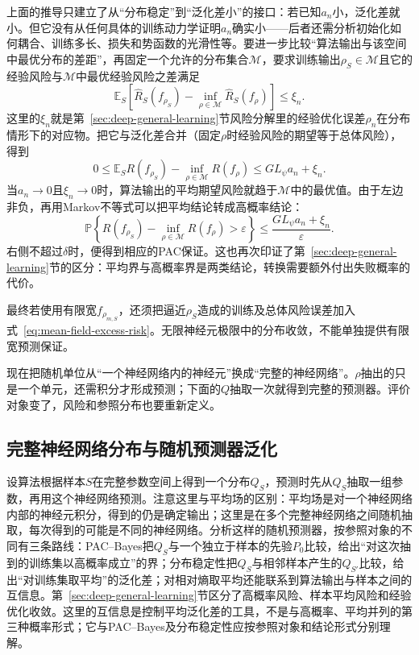上面的推导只建立了从“分布稳定”到“泛化差小”的接口：若已知$a_n$小，泛化差就小。但它没有从任何具体的训练动力学证明$a_n$确实小——后者还需分析初始化如何耦合、训练多长、损失和势函数的光滑性等。要进一步比较“算法输出与该空间中最优分布的差距”，再固定一个允许的分布集合$\mathcal M$，要求训练输出$\rho_S\in\mathcal M$且它的经验风险与$\mathcal M$中最优经验风险之差满足
\[
 \mathbb E_S\left[
   \hat R_S(f_{\rho_S})
   -\inf_{\rho\in\mathcal M}\hat R_S(f_\rho)
 \right]\leq\xi_n.
\]
这里的$\xi_n$就是第~\ref{sec:deep-general-learning}节风险分解里的经验优化误差$\rho_n$在分布情形下的对应物。把它与泛化差合并（固定$\rho$时经验风险的期望等于总体风险），得到
\begin{equation}
 0\leq
 \mathbb E_S R(f_{\rho_S})
 -\inf_{\rho\in\mathcal M}R(f_\rho)
 \leq G L_\psi a_n+\xi_n.
 \label{eq:mean-field-excess-risk}
\end{equation}
当$a_n\to0$且$\xi_n\to0$时，算法输出的平均期望风险就趋于$\mathcal M$中的最优值。由于左边非负，再用Markov不等式可以把平均结论转成高概率结论：
\[
 \mathbb P\left\{
 R(f_{\rho_S})-\inf_{\rho\in\mathcal M}R(f_\rho)>\varepsilon
 \right\}
 \leq\frac{G L_\psi a_n+\xi_n}{\varepsilon}.
\]
右侧不超过$\delta$时，便得到相应的PAC保证。这也再次印证了第~\ref{sec:deep-general-learning}节的区分：平均界与高概率界是两类结论，转换需要额外付出失败概率的代价。

最终若使用有限宽$f_{\rho_{m,S}}$，还须把逼近$\rho_S$造成的训练及总体风险误差加入式~\eqref{eq:mean-field-excess-risk}。无限神经元极限中的分布收敛，不能单独提供有限宽预测保证。

现在把随机单位从“一个神经网络内的神经元”换成“完整的神经网络”。$\rho$抽出的只是一个单元，还需积分才形成预测；下面的$Q$抽取一次就得到完整的预测器。评价对象变了，风险和参照分布也要重新定义。

\subsection{完整神经网络分布与随机预测器泛化}
\label{sec:pac-bayes}

设算法根据样本$S$在完整参数空间上得到一个分布$Q_S$，预测时先从$Q_S$抽取一组参数，再用这个神经网络预测。注意这里与平均场的区别：平均场是对一个神经网络内部的神经元积分，得到的仍是确定输出；这里是在多个完整神经网络之间随机抽取，每次得到的可能是不同的神经网络。分析这样的随机预测器，按参照对象的不同有三条路线：PAC--Bayes把$Q_S$与一个独立于样本的先验$P_0$比较，给出“对这次抽到的训练集以高概率成立”的界；分布稳定性把$Q_S$与相邻样本产生的$Q_{S'}$比较，给出“对训练集取平均”的泛化差；对相对熵取平均还能联系到算法输出与样本之间的互信息。第~\ref{sec:deep-general-learning}节区分了高概率风险、样本平均风险和经验优化收敛。这里的互信息是控制平均泛化差的工具，不是与高概率、平均并列的第三种概率形式；它与PAC--Bayes及分布稳定性应按参照对象和结论形式分别理解。

